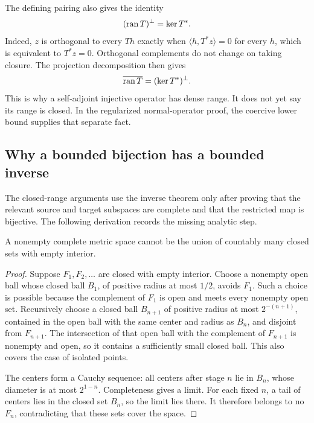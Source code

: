 The defining pairing also gives the identity
\begin{equation}\label{eq:adjoint-range-orthogonal}
 (\operatorname{ran} T)^\perp=\ker T^*.
\end{equation}
Indeed, \(z\) is orthogonal to every \(Th\) exactly when \(\langle h,T^*z\rangle=0\) for every \(h\), which is equivalent to \(T^*z=0\). Orthogonal complements do not change on taking closure. The projection decomposition then gives
\[
 \overline{\operatorname{ran} T}=(\ker T^*)^\perp.
\]
This is why a self-adjoint injective operator has dense range. It does not yet say its range is closed. In the regularized normal-operator proof, the coercive lower bound supplies that separate fact.

\subsection{Why a bounded bijection has a bounded inverse}
The closed-range arguments use the inverse theorem only after proving that the relevant source and target subspaces are complete and that the restricted map is bijective. The following derivation records the missing analytic step.

\begin{lemma}\label{lem:baire-tool}
A nonempty complete metric space cannot be the union of countably many closed sets with empty interior.
\end{lemma}
\begin{proof}
Suppose \(F_1,F_2,\ldots\) are closed with empty interior. Choose a nonempty open ball whose closed ball \(B_1\), of positive radius at most \(1/2\), avoids \(F_1\). Such a choice is possible because the complement of \(F_1\) is open and meets every nonempty open set. Recursively choose a closed ball \(B_{n+1}\) of positive radius at most \(2^{-(n+1)}\), contained in the open ball with the same center and radius as \(B_n\), and disjoint from \(F_{n+1}\). The intersection of that open ball with the complement of \(F_{n+1}\) is nonempty and open, so it contains a sufficiently small closed ball. This also covers the case of isolated points.

The centers form a Cauchy sequence: all centers after stage \(n\) lie in \(B_n\), whose diameter is at most \(2^{1-n}\). Completeness gives a limit. For each fixed \(n\), a tail of centers lies in the closed set \(B_n\), so the limit lies there. It therefore belongs to no \(F_n\), contradicting that these sets cover the space.
\end{proof}

